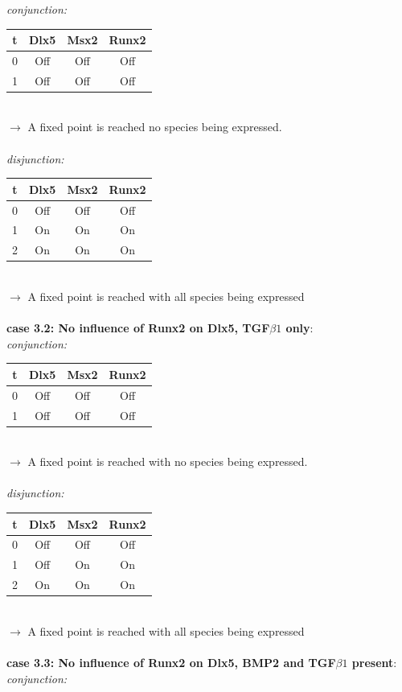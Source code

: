 \documentclass[11pt]{article}
\begin{document}
\begin{appendices}
\textit{conjunction:}
\\
\begin{tabular}{c c c c}
t & Dlx5 & Msx2 & Runx2 \\
\hline
0 & Off & Off & Off \\
1 & Off & Off & Off
\end{tabular}
\\
$\rightarrow$ A fixed point is reached no species being expressed.  
\\ \\
\textit{disjunction:}
\\ 
\begin{tabular}{c c c c}
t & Dlx5 & Msx2 & Runx2 \\
\hline
0 & Off & Off & Off \\
1 & On & On & On \\
2 & On & On & On
\end{tabular}
\\
$\rightarrow$ A fixed point is reached with all species being expressed
\\ \\
\textbf{case 3.2: No influence of Runx2 on Dlx5, TGF$\beta1$ only}: \\
\textit{conjunction:}
\\ 
\begin{tabular}{c c c c}
t & Dlx5 & Msx2 & Runx2 \\
\hline
0 & Off & Off & Off \\
1 & Off & Off & Off
\end{tabular}
\\
$\rightarrow$ A fixed point is reached with no species being expressed.  
\\ \\
\textit{disjunction:}
\\ 
\begin{tabular}{c c c c}
t & Dlx5 & Msx2 & Runx2 \\
\hline
0 & Off & Off & Off \\
1 & Off & On & On \\
2 & On & On & On
\end{tabular}
\\
$\rightarrow$ A fixed point is reached with all species being expressed
\\ \\
\textbf{case 3.3: No influence of Runx2 on Dlx5, BMP2 and TGF$\beta1$ present}: \\
\textit{conjunction:}
\\ 
\begin{tabular}{c c c c}

\end{tabular}
\end{appendices}
\end{document}
